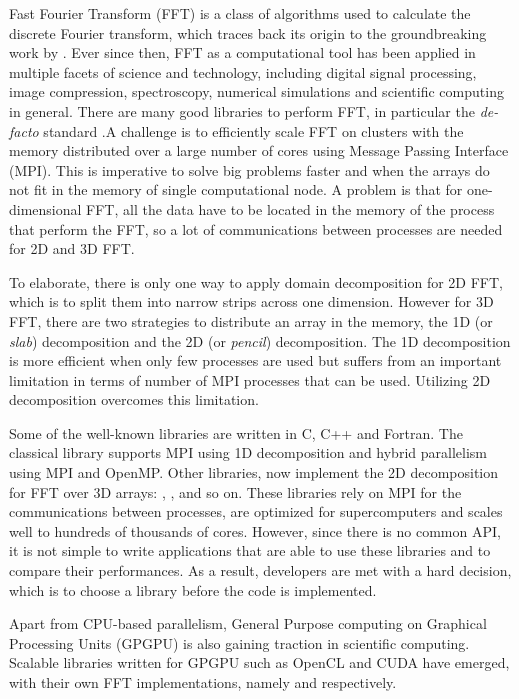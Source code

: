 Fast Fourier Transform (FFT) is a class of algorithms used to calculate the
discrete Fourier transform, which traces back its origin to the groundbreaking
work by \citet{cooley_tukey}.
%
Ever since then, FFT as a computational tool has been applied in multiple
facets of science and technology, including digital signal processing, image
compression, spectroscopy, numerical simulations and scientific computing in
general. There are many good libraries to perform FFT, in particular the
\emph{de-facto} standard  \citep{frigo2005design}.\@ A challenge
is to efficiently scale FFT on clusters with the memory distributed over a
large number of cores using Message Passing Interface (MPI). This is imperative
to solve big problems faster and when the arrays do not fit in the memory of
single computational node.
%
A problem is that for one-dimensional FFT, all the data have to be located in the
memory of the process that perform the FFT, so a lot of communications between
processes are needed for 2D and 3D FFT.

To elaborate, there is only one way to apply domain decomposition for 2D FFT,
which is to split them into narrow strips across one dimension. However for 3D
FFT, there are two strategies to distribute an array in the memory, the 1D (or
\emph{slab}) decomposition and the 2D (or \emph{pencil}) decomposition. The 1D
decomposition is more efficient when only few processes are used but suffers
from an important limitation in terms of number of MPI processes that can be
used. Utilizing 2D decomposition overcomes this limitation.

Some of the well-known libraries are written in C, C++ and Fortran. The classical
 library supports MPI using 1D decomposition and hybrid parallelism
using MPI and OpenMP. Other libraries, now implement the 2D decomposition for
FFT over 3D arrays:  \citep{pippig_pfft2013}, 
\citep{pekurovsky2012p3dfft},  and so on. These libraries
rely on MPI for the communications between processes, are optimized for
supercomputers and scales well to hundreds of thousands of cores. However, since
there is no common API, it is not simple to write applications that are able to
use these libraries and to compare their performances. As a result, developers are
met with a hard decision, which is to choose a library before the code is
implemented.

Apart from CPU-based parallelism, General Purpose computing on Graphical
Processing Units (GPGPU) is also gaining traction in scientific computing.
Scalable libraries written for GPGPU such as OpenCL and CUDA have emerged, with
their own FFT implementations, namely  and 
respectively.

